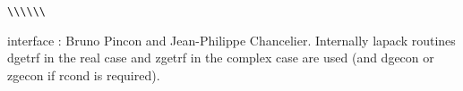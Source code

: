 \begin{examples}
  \begin{program}\verb+\+\verb+\+\verb+\+\verb+\+\verb+\+\verb+\+
  \end{program}
\end{examples}

\begin{manseealso}
\end{manseealso}

\begin{authors}
   interface : Bruno Pincon and Jean-Philippe Chancelier. Internally lapack routines dgetrf in the
   real case and zgetrf in the complex case are used (and dgecon or zgecon if
   rcond is required).
\end{authors}
